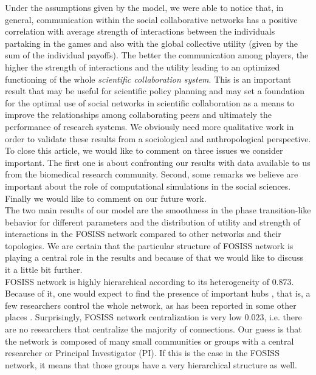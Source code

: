 \documentclass{bmcart}
\begin{document}
  Under the assumptions given by the model, we were able to
  notice that, in general, communication within the social
  collaborative networks has a positive correlation with average
  strength of interactions between the individuals partaking in the
  games and also with the global collective utility (given by the sum
  of the individual payoffs). The better the communication among
  players, the higher the strength of interactions and the utility
  leading to an optimized functioning of the whole \emph{scientific
    collaboration system}. This is an important result that may be
  useful for scientific policy planning and may set a foundation for
  the optimal use of social networks in scientific collaboration as a
  means to improve the relationships among collaborating peers and
  ultimately the performance of research systems.  We obviously need
  more qualitative work in order to validate these results from a
  sociological and anthropological perspective.\\

  
  
 To close this article, we would like to comment on three
  issues we consider important. The first one is about confronting our
  results with data available to us from the biomedical research
  community. Second, some remarks we believe are important about the
  role of computational simulations in the social sciences. Finally we
  would like to comment on our future work.\\


  The two main results of our model are the smoothness in
  the phase transition-like behavior for different parameters and the
  distribution of utility and strength of interactions in the FOSISS
  network compared to other networks and their topologies. We are
  certain that the particular structure of FOSISS network is playing a
  central role in the results and because of that we would like to
  discuss it a little bit further.\\

  FOSISS network is highly hierarchical according to its
  heterogeneity of $0.873$. Because of it, one would expect to find
  the presence of important hubs \cite{Wu:2008}, that is, a few
  researchers control the whole network, as has been reported in some
  other places \cite{yousefi-etal:2008}. Surprisingly, FOSISS network
  centralization is very low $0.023$, i.e. there are no researchers
  that centralize the majority of connections. Our guess is that the
  network is composed of many small communities or groups with a
  central researcher or Principal Investigator (PI). If this is the
  case in the FOSISS network, it means that those groups have a very
  hierarchical structure as well.\\
\end{document}
